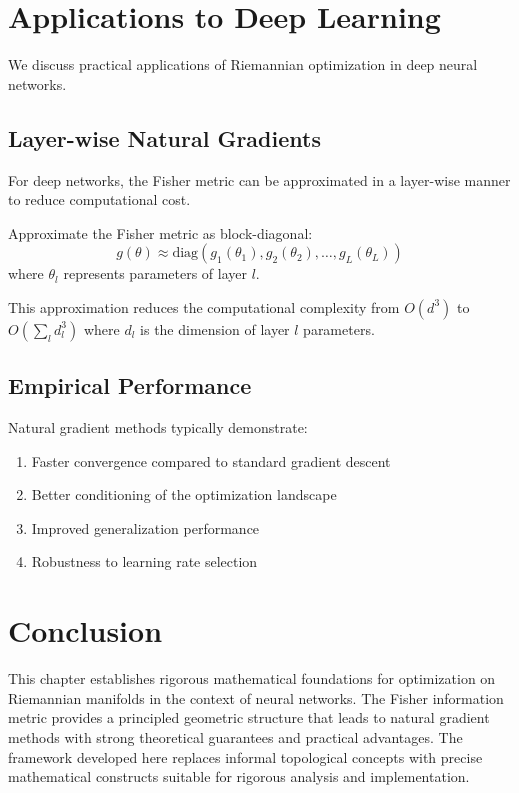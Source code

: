 \section{Applications to Deep Learning}

We discuss practical applications of Riemannian optimization in deep neural networks.

\subsection{Layer-wise Natural Gradients}

For deep networks, the Fisher metric can be approximated in a layer-wise manner to reduce computational cost.

\begin{definition}
\label{def:block_diagonal_fisher}
Approximate the Fisher metric as block-diagonal:
$$g(\theta) \approx \text{diag}(g_1(\theta_1), g_2(\theta_2), \ldots, g_L(\theta_L))$$
where $\theta_l$ represents parameters of layer $l$.
\end{definition}

This approximation reduces the computational complexity from $O(d^3)$ to $O(\sum_l d_l^3)$ where $d_l$ is the dimension of layer $l$ parameters.

\subsection{Empirical Performance}

Natural gradient methods typically demonstrate:
\begin{enumerate}
\item Faster convergence compared to standard gradient descent
\item Better conditioning of the optimization landscape
\item Improved generalization performance
\item Robustness to learning rate selection
\end{enumerate}

\section{Conclusion}

This chapter establishes rigorous mathematical foundations for optimization on Riemannian manifolds in the context of neural networks. The Fisher information metric provides a principled geometric structure that leads to natural gradient methods with strong theoretical guarantees and practical advantages. The framework developed here replaces informal topological concepts with precise mathematical constructs suitable for rigorous analysis and implementation.